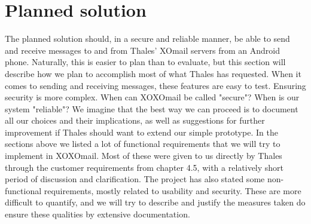 \section{Planned solution}\label{sec:plansol}

The planned solution should, in a secure and reliable manner, be able to send and receive messages to and from Thales' XOmail servers from an Android phone. Naturally, this is easier to plan than to evaluate, but this section will describe how we plan to accomplish most of what Thales has requested.
\newline
\newline
When it comes to sending and receiving messages, these features are easy to test. Ensuring security is more complex. When can XOXOmail be called "secure"? When is our system "reliable"? We imagine that the best way we can proceed is to document all our choices and their implications, as well as suggestions for further improvement if Thales should want to extend our simple prototype.
\newline
\newline
In the sections above we listed a lot of functional requirements that we will try to implement in XOXOmail. Most of these were given to us directly by Thales through the customer requirements from chapter 4.5, with a relatively short period of discussion and clarification.
\newline
\newline
The project has also stated some non-functional requirements, mostly related to usability and security. These are more difficult to quantify, and we will try to describe and justify the measures taken do ensure these qualities by extensive documentation.